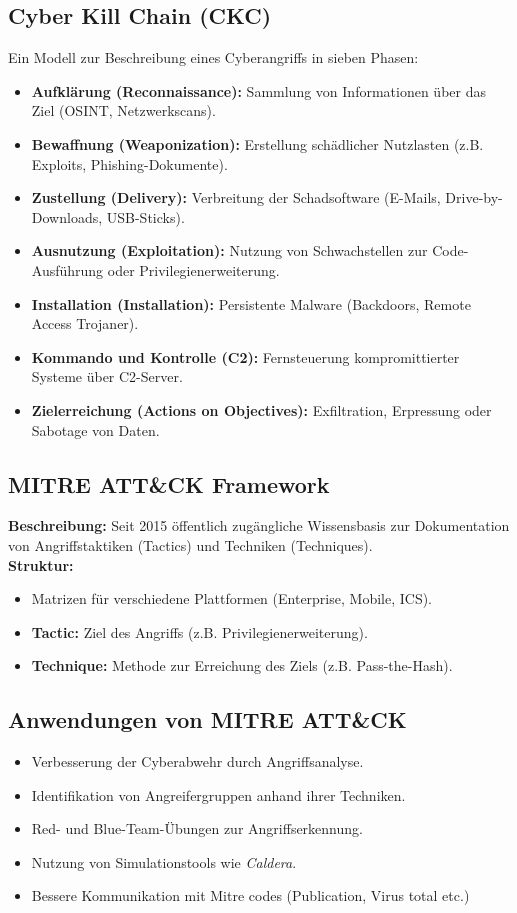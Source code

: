 \subsection{Cyber Kill Chain (CKC)}
Ein Modell zur Beschreibung eines Cyberangriffs in sieben Phasen:
\begin{itemize}
    \item \textbf{Aufklärung (Reconnaissance):} Sammlung von Informationen über das Ziel (OSINT, Netzwerkscans).
    \item \textbf{Bewaffnung (Weaponization):} Erstellung schädlicher Nutzlasten (z.B. Exploits, Phishing-Dokumente).
    \item \textbf{Zustellung (Delivery):} Verbreitung der Schadsoftware (E-Mails, Drive-by-Downloads, USB-Sticks).
    \item \textbf{Ausnutzung (Exploitation):} Nutzung von Schwachstellen zur Code-Ausführung oder Privilegienerweiterung.
    \item \textbf{Installation (Installation):} Persistente Malware (Backdoors, Remote Access Trojaner).
    \item \textbf{Kommando und Kontrolle (C2):} Fernsteuerung kompromittierter Systeme über C2-Server.
    \item \textbf{Zielerreichung (Actions on Objectives):} Exfiltration, Erpressung oder Sabotage von Daten.
\end{itemize}

\subsection{MITRE ATT\&CK Framework}
\textbf{Beschreibung:} Seit 2015 öffentlich zugängliche Wissensbasis zur Dokumentation von Angriffstaktiken (Tactics) und Techniken (Techniques).\\
\textbf{Struktur:} 
\begin{itemize}
    \item Matrizen für verschiedene Plattformen (Enterprise, Mobile, ICS).
    \item \textbf{Tactic:} Ziel des Angriffs (z.B. Privilegienerweiterung).
    \item \textbf{Technique:} Methode zur Erreichung des Ziels (z.B. Pass-the-Hash).
\end{itemize}

\subsection{Anwendungen von MITRE ATT\&CK}
\begin{itemize}
    \item Verbesserung der Cyberabwehr durch Angriffsanalyse.
    \item Identifikation von Angreifergruppen anhand ihrer Techniken.
    \item Red- und Blue-Team-Übungen zur Angriffserkennung.
    \item Nutzung von Simulationstools wie \textit{Caldera}.
    \item Bessere Kommunikation mit Mitre codes (Publication, Virus total etc.)
\end{itemize}

